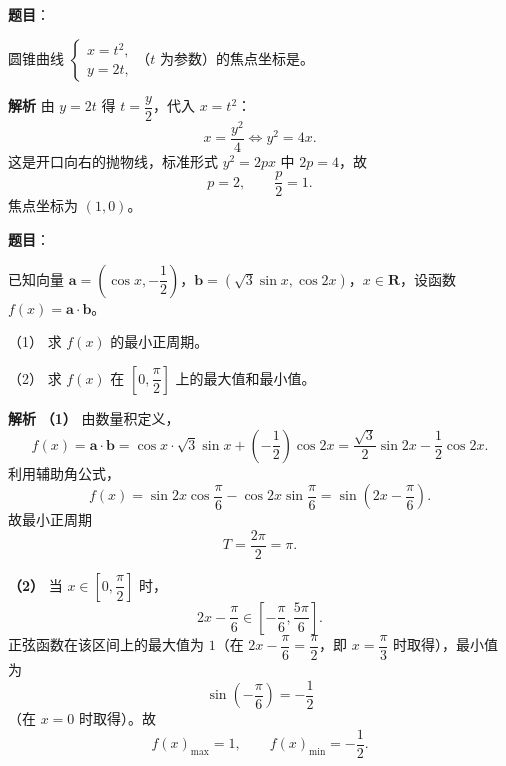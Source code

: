 \begin{answer}

\textbf{题目}：

圆锥曲线 $\begin{cases}x=t^2,\\y=2t,\end{cases}$（$t$ 为参数）的焦点坐标是\gkblank{}。

\textbf{解析}
由 $y=2t$ 得 $t=\dfrac y2$，代入 $x=t^2$：
\nopagebreak[4]
\[x=\frac{y^2}{4}\Longleftrightarrow y^2=4x.\]
这是开口向右的抛物线，标准形式 $y^2=2px$ 中 $2p=4$，故
\nopagebreak[4]
\[p=2,\qquad \frac p2=1.\]
焦点坐标为 $(1,0)$。


\end{answer}
\begin{answer}

\textbf{题目}：

已知向量 $\boldsymbol a=\left(\cos x,-\dfrac12\right)$，$\boldsymbol b=\left(\sqrt3\sin x,\cos2x\right)$，$x\in\mathbf R$，设函数 $f(x)=\boldsymbol a\cdot\boldsymbol b$。

（1） 求 $f(x)$ 的最小正周期。

（2） 求 $f(x)$ 在 $\left[0,\dfrac\pi2\right]$ 上的最大值和最小值。

\textbf{解析}
\textbf{（1）} 由数量积定义，
\nopagebreak[4]
\[f(x)=\boldsymbol a\cdot\boldsymbol b=\cos x\cdot\sqrt3\sin x+\left(-\frac12\right)\cos2x
=\frac{\sqrt3}{2}\sin2x-\frac12\cos2x.\]
利用辅助角公式，
\nopagebreak[4]
\[f(x)=\sin2x\cos\frac\pi6-\cos2x\sin\frac\pi6=\sin\left(2x-\frac\pi6\right).\]
故最小正周期
\nopagebreak[4]
\[T=\frac{2\pi}{2}=\pi.\]

\textbf{（2）} 当 $x\in\left[0,\dfrac\pi2\right]$ 时，
\nopagebreak[4]
\[2x-\frac\pi6\in\left[-\frac\pi6,\frac{5\pi}6\right].\]
正弦函数在该区间上的最大值为 $1$（在 $2x-\dfrac\pi6=\dfrac\pi2$，即 $x=\dfrac\pi3$ 时取得），最小值为
\nopagebreak[4]
\[\sin\left(-\frac\pi6\right)=-\frac12\]
（在 $x=0$ 时取得）。故
\nopagebreak[4]
\[f(x)_{\max}=1,\qquad f(x)_{\min}=-\frac12.\]



\end{answer}
